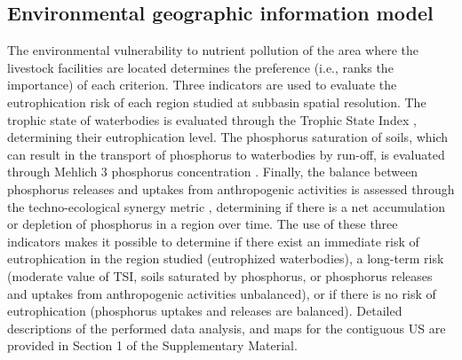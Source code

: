 \documentclass[authoryear]{elsarticle}
\begin{document}

\subsection{Environmental geographic information model}
The environmental vulnerability to nutrient pollution of the area where the livestock facilities are located determines the preference (i.e., ranks the importance) of each criterion. 
Three indicators are used to evaluate the eutrophication risk of each region studied at subbasin spatial resolution. The trophic state of waterbodies is evaluated through the Trophic State Index
\citep{carlson_trophic_1977}, determining their eutrophication level. The phosphorus saturation of soils, which can result in the transport of phosphorus to waterbodies by run-off, is evaluated through Mehlich 3 phosphorus concentration \citep{Espinoza2006}. Finally, the balance between phosphorus releases and uptakes from  anthropogenic activities is assessed through the techno-ecological synergy
metric \citep{TESmetric}, determining if there is a net accumulation or depletion of phosphorus in a region over time. 
The use of these three indicators makes it possible to determine if there exist an immediate risk of eutrophication in the region studied (eutrophized waterbodies), a long-term risk (moderate value of TSI, soils saturated by phosphorus, or phosphorus releases and uptakes from  anthropogenic activities unbalanced), or if there is no risk of eutrophication (phosphorus uptakes and releases are balanced). Detailed descriptions of the performed data analysis, and maps for the contiguous US are provided in Section 1 of the Supplementary Material.
\end{document}
